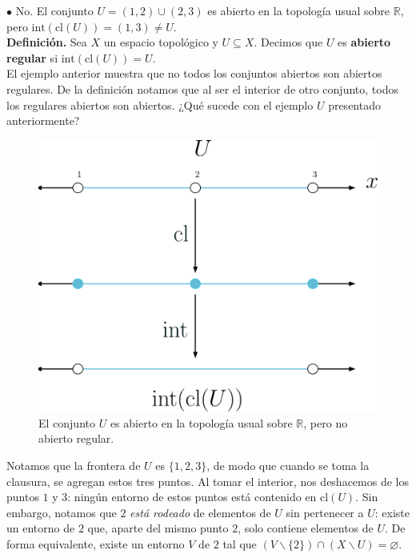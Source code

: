 \documentclass{article}
\begin{document}
\newpage

$\bullet$ No. El conjunto $U = (1, 2) \cup (2, 3)$ es abierto en la topología usual sobre $\mathbb{R}$, pero $\text{int}(\text{cl}(U)) = (1, 3) \neq U.$\\

\textbf{Definición. } Sea $X$ un espacio topológico y $U \subseteq X$. Decimos que $U$ es \textbf{abierto regular} si $\text{int}(\text{cl}(U)) = U$. \\

El ejemplo anterior muestra que no todos los conjuntos abiertos son abiertos regulares. De la definición notamos que al ser el interior de otro conjunto, todos los regulares abiertos son abiertos. ¿Qué sucede con el ejemplo $U$ presentado anteriormente?

\begin{figure}[h]
	\centering \includegraphics[scale=0.13]{e2fig3.png}
	\caption{El conjunto $U$ es abierto en la topología usual sobre $\mathbb{R}$, pero no abierto regular. }
\end{figure}

Notamos que la frontera de $U$ es $\{ 1, 2, 3 \}$, de modo que cuando se toma la clausura, se agregan estos tres puntos. Al tomar el interior, nos deshacemos de los puntos $1$ y $3$: ningún entorno de estos puntos está contenido en $\text{cl}(U)$. Sin embargo, notamos que $2$ \textit{está rodeado} de elementos de $U$ sin pertenecer a $U$: existe un entorno de $2$ que, aparte del mismo punto $2$, solo contiene elementos de $U$. De forma equivalente, existe un entorno $V$ de $2$ tal que $( V \backslash \{ 2 \} )\cap (X \backslash U) = \varnothing$. \\
\end{document}
